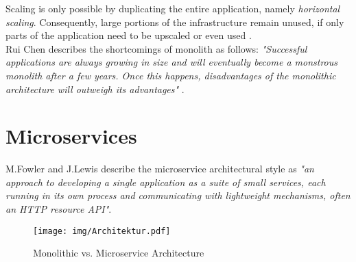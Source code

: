 Scaling is only possible by duplicating the entire application, namely \textit{horizontal scaling}. Consequently, large portions of the infrastructure remain unused, if only parts of the application need to be upscaled or even used \cite{EnticeApproach} \cite{MigratingTowardsSurvey}. \\
Rui Chen describes the shortcomings of monolith as follows:\textit{ "Successful applications
are always growing in size and will eventually become a
monstrous monolith after a few years. Once this happens,
disadvantages of the monolithic architecture will outweigh
its advantages" }\cite{DataflowDrivenChen}.



\section{Microservices}
\label{sec:background:microservices}
M.Fowler and J.Lewis describe the microservice architectural style as \textit{"an approach to developing a single application as a suite of small services, each running in its own process and communicating with lightweight mechanisms, often an HTTP resource API"}\cite{Fowler}.

\begin{figure}[t]
	\texttt{[image: img/Architektur.pdf]}
	\caption{Monolithic vs. Microservice Architecture}
	\label{fig:architekturMonolithVsMS}
\end{figure}

